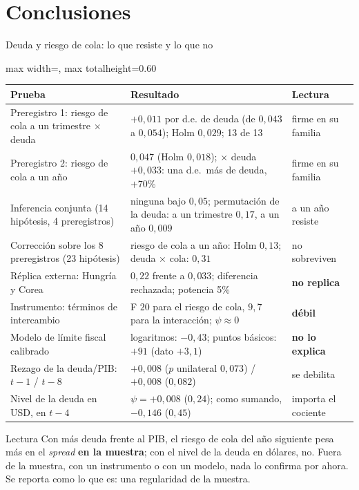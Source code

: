 \documentclass[aspectratio=169]{beamer}
\begin{document}
\section{Conclusiones}

\begin{frame}{Deuda y riesgo de cola: lo que resiste y lo que no}
\centering
\scriptsize
\begin{adjustbox}{max width=\textwidth, max totalheight=0.60\textheight}
\begin{tabular}{>{\raggedright\arraybackslash}p{}>{\raggedright\arraybackslash}p{}>{\raggedright\arraybackslash}p{}}
\toprule
Prueba & Resultado & Lectura \\
\midrule
Preregistro 1: riesgo de cola a un trimestre $\times$ deuda & $+0{,}011$ por d.e. de deuda (de $0{,}043$ a $0{,}054$); Holm $0{,}029$; 13 de 13 & firme en su familia \\
Preregistro 2: riesgo de cola a un año & $0{,}047$ (Holm $0{,}018$); $\times$ deuda $+0{,}033$: una d.e.\ más de deuda, $+70\%$ & firme en su familia \\
\addlinespace
Inferencia conjunta (14 hipótesis, 4 preregistros) & ninguna bajo $0{,}05$; permutación de la deuda: a un trimestre $0{,}17$, a un año $0{,}009$ & a un año resiste \\
Corrección sobre los 8 preregistros (23 hipótesis) & riesgo de cola a un año: Holm $0{,}13$; deuda $\times$ cola: $0{,}31$ & no sobreviven \\
\addlinespace
Réplica externa: Hungría y Corea & $0{,}22$ frente a $0{,}033$; diferencia rechazada; potencia 5\% & \textbf{no replica} \\
Instrumento: términos de intercambio & F $20$ para el riesgo de cola, $9{,}7$ para la interacción; $\psi\approx0$ & \textbf{débil} \\
Modelo de límite fiscal calibrado & logaritmos: $-0{,}43$; puntos básicos: $+91$ (dato $+3{,}1$) & \textbf{no lo explica} \\
\addlinespace
Rezago de la deuda/PIB: $t-1$ / $t-8$ & $+0{,}008$ ($p$ unilateral $0{,}073$) / $+0{,}008$ ($0{,}082$) & se debilita \\
Nivel de la deuda en USD, en $t-4$ & $\psi=+0{,}008$ ($0{,}24$); como sumando, $-0{,}146$ ($0{,}45$) & importa el cociente \\
\bottomrule
\end{tabular}
\end{adjustbox}
\vspace{2pt}
\begin{block}{Lectura}
\scriptsize Con más deuda frente al PIB, el riesgo de cola del año siguiente pesa más en el \textit{spread} \textbf{en la muestra}; con el nivel de la deuda en dólares, no. Fuera de la muestra, con un instrumento o con un modelo, nada lo confirma por ahora. Se reporta como lo que es: una regularidad de la muestra.
\end{block}
\end{frame}
\end{document}
